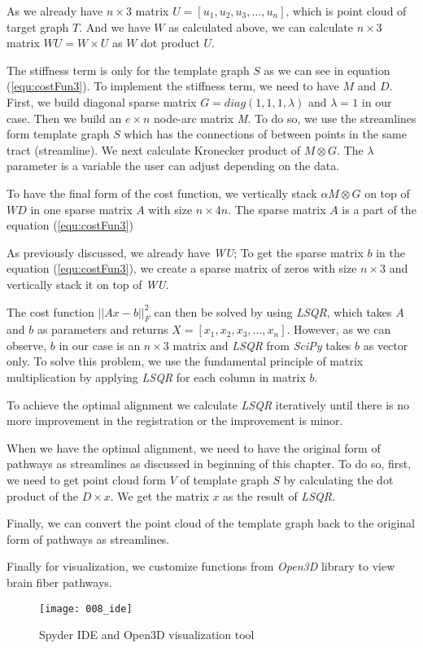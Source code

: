 \documentclass[../structure.tex]{subfiles}
\begin{document}
As we already have $n\times 3$ matrix $U=[u_{1}, u_{2}, u_{3}, \dots , u_{n}]$, which is point cloud of target graph $T$. And we have $W$ as calculated above, we can calculate $n\times 3$ matrix $WU=W\times U$ as $W$ dot product $U$.

The stiffness term is only for the template graph $S$ as we can see in equation (\ref{equ:costFun3}). To implement the stiffness term, we need to have $M$ and $D$. First, we build diagonal sparse matrix $G = diag(1,1,1,\lambda)$ and $\lambda=1$ in our case. Then we build an $e\times n$ node-arc matrix \textit{M}. To do so, we use the streamlines form template graph $S$ which has the connections of between points in the same tract (streamline). We next calculate Kronecker product of $M \otimes G$. The $\lambda$ parameter is a variable the user can adjust depending on the data.

To have the final form of the cost function, we vertically stack $\alpha M \otimes G$ on top of $WD$ in one sparse matrix $A$ with size $n\times 4n$.  The sparse matrix $A$ is a part of the equation (\ref{equ:costFun3})

As previously discussed, we already have \textit{WU}; To get the sparse matrix $b$ in the equation (\ref{equ:costFun3}), we create a sparse matrix of zeros with size $n\times 3$ and vertically stack it on top of \textit{WU}.

The cost function $||Ax-b||_{F}^2$ can then be solved by using \textit{LSQR}, which takes $A$ and $b$ as parameters and returns $X=[x_{1}, x_{2}, x_{3}, \dots, x_{n}]$. However, as we can observe, $b$ in our case is an $n\times 3$ matrix and \textit{LSQR} from \textit{SciPy} takes $b$ as vector only. To solve this problem, we use the fundamental principle of matrix multiplication by applying \textit{LSQR} for each column in matrix $b$.

To achieve the optimal alignment we calculate \textit{LSQR} iteratively until there is no more improvement in the registration or the improvement is minor.

When we have the optimal alignment, we need to have the original form of pathways as streamlines as discussed in beginning of this chapter. To do so, first, we need to get point cloud form $V$ of template graph $S$ by calculating the dot product of the $D\times x$. We get the matrix $x$ as the result of \textit{LSQR}. 

Finally, we can convert the point cloud of the template graph back to the original form of pathways as streamlines.

Finally for visualization, we customize functions from \textit{Open3D} \cite{Zhou2018} library to view brain fiber pathways.

\begin{figure}[h!]
\centering
\texttt{[image: 008\_ide]}
\captionsetup{justification=centering}
\caption{Spyder IDE and Open3D visualization tool}
\end{figure}
\end{document}
